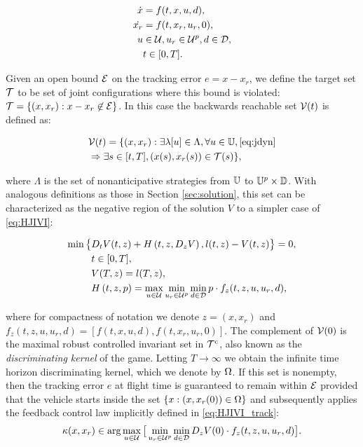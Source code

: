 \begin{equation}
\label{eq:jdyn} %
\begin{aligned}
\dot{x} &= f(t, x, u, d), \\
\dot{x_r} &=f(t,x_r,u_r,0),\\
u &\in \cset, u_r\in\cset^p, d \in \dset, \\
&t \in [0, T].
\end{aligned}
\end{equation}

Given an open bound $\mathcal{E}$ on the tracking error $e=x-x_r$, we define the target set $\mathcal{T}$ to be set of joint configurations where this bound is violated: $\mathcal{T} = \{(x,x_r): x-x_r\not\in\mathcal{E}\}$. In this case the backwards reachable set $\mathcal{V}(t)$ is defined as:

\begin{equation}
\label{eq:brs}
\begin{aligned}
&\mathcal{V}(t) = \{(x,x_r):  \exists \lambda[u] \in \Lambda, \forall u \in \mathbb{U}, \eqref{eq:jdyn} \\
&\Rightarrow \exists s \in [t, T], (x(s),x_r(s)) \in \mathcal{T}(s)\},
\end{aligned}
\end{equation}

where $\Lambda$ is the set of nonanticipative strategies from $\mathbb{U}$ to $\mathbb{U}^p\times \mathbb{D}$.
With analogous definitions as those in Section \ref{sec:solution}, this set can be characterized as the negative region of the solution $V$ to a simpler case of \eqref{eq:HJIVI}:

\begin{equation}
\label{eq:HJIVI_track}
\begin{aligned}
\min\big\{&D_t V(t, z) + H\left(t, z, D_z V\right), l(t,z) - V(t, z)\big\}= 0,\\&  t\in[0,T],\\
&V(T, z) = l(T, z),\\
&H\left(t, z, p\right) = \max_{u \in \mathcal{U}} \min_{u_r \in\mathcal{U}^p} \min_{d \in \mathcal{D}} p \cdot f_z(t,z,u,u_r,d),
\end{aligned}
\end{equation}

\noindent where for compactness of notation we denote $z=(x,x_r)$ and $f_z(t,z,u,u_r,d) = [f(t,x,u,d),f(t,x_r,u_r,0)]$.
 The complement of $\mathcal{V}(0)$ is the maximal robust controlled invariant set in $\mathcal{T}^\text{c}$, also known as the \emph{discriminating kernel} of the game. Letting $T\to\infty$ we obtain the infinite time horizon discriminating kernel, which we denote by $\Omega$. If this set is nonempty, then the tracking error $e$ at flight time is guaranteed to remain within $\mathcal{E}$ provided that the vehicle starts inside the set $\{x: (x,x_r(0))\in\Omega\}$ and subsequently applies the feedback control law implicitly defined in \eqref{eq:HJIVI_track}:
\begin{equation}\label{eq:robust_tracking_law}
\kappa(x,x_r) \in \arg\max_{u \in \mathcal{U}} \big[\min_{u_r \in\mathcal{U}^p} \min_{d \in \mathcal{D}} D_z V(0) \cdot f_z(t,z,u,u_r,d)\big].
\end{equation}

